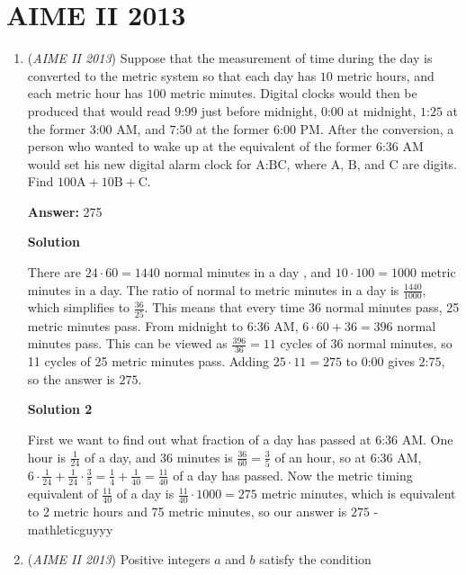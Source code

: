 \section{AIME II 2013}
        \begin{enumerate}
        	\item (\textit{AIME II 2013}) Suppose that the measurement of time during the day is converted to the metric system so that each day has $10$ metric hours, and each metric hour has $100$ metric minutes. Digital clocks would then be produced that would read $\text{9:99}$ just before midnight, $\text{0:00}$ at midnight, $\text{1:25}$ at the former $\text{3:00}$ AM, and $\text{7:50}$ at the former $\text{6:00}$ PM. After the conversion, a person who wanted to wake up at the equivalent of the former $\text{6:36}$ AM would set his new digital alarm clock for $\text{A:BC}$, where $\text{A}$, $\text{B}$, and $\text{C}$ are digits. Find $100\text{A}+10\text{B}+\text{C}$.


 
 \textbf{Answer: }275



\textbf{Solution}

There are $24 \cdot 60=1440$ normal minutes in a day , and $10 \cdot 100=1000$ metric minutes in a day. The ratio of normal to metric minutes in a day is $\frac{1440}{1000}$, which simplifies to $\frac{36}{25}$. This means that every time 36 normal minutes pass, 25 metric minutes pass. From midnight to $\text{6:36}$ AM, $6 \cdot 60+36=396$ normal minutes pass. This can be viewed as $\frac{396}{36}=11$ cycles of 36 normal minutes, so 11 cycles of 25 metric minutes pass. Adding $25 \cdot 11=275$ to $\text{0:00}$ gives $\text{2:75}$, so the answer is $\boxed{275}$.

 



\textbf{Solution 2}

First we want to find out what fraction of a day has passed at 6:36 AM. One hour is $\frac{1}{24}$ of a day, and 36 minutes is $\frac{36}{60}=\frac{3}{5}$ of an hour, so at 6:36 AM, $6 \cdot \frac{1}{24} + \frac{1}{24} \cdot \frac{3}{5}=\frac{1}{4}+\frac{1}{40}=\frac{11}{40}$ of a day has passed. Now the metric timing equivalent of $\frac{11}{40}$ of a day is $\frac{11}{40}\cdot 1000=275$ metric minutes, which is equivalent to 2 metric hours and 75 metric minutes, so our answer is $\boxed{275}$ - mathleticguyyy

 


	\item (\textit{AIME II 2013}) Positive integers $a$ and $b$ satisfy the condition


\end{enumerate}
